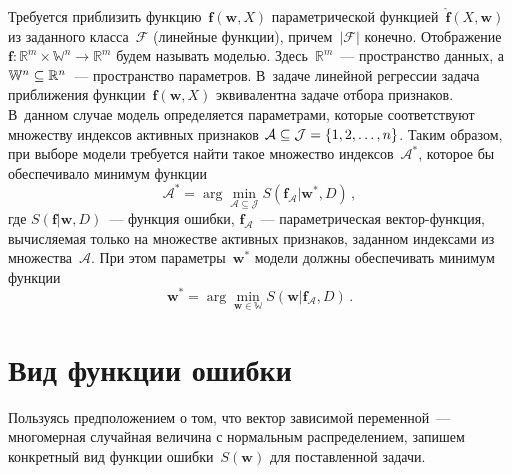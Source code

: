 \begin{multicols}{2}
 Требуется приблизить функцию~$\mathbf{f}(\mathbf{w}, X)$ 
 параметрической функцией~$\widehat{\mathbf{f}}(X,\mathbf{w})$ 
 из заданного класса~$\mathcal{F}$ (линейные функции), 
 причем~$|\mathcal{F}|$ конечно. Отображение
 $\mathbf{f}:\mathbb{R}^m \times \mathbb{W}^n \rightarrow \mathbb{R}^m$ будем называть 
 моделью. Здесь~$\mathbb{R}^m$~--- пространство данных,\linebreak 
 а~$\mathbb{W}^n \hm\subseteq \mathbb{R}^n$~--- пространство параметров. 
 В~задаче линейной регрессии задача приближения функции~$\mathbf{f}(\mathbf{w}, X)$ 
 эквивалентна задаче отбора приз\-наков. В~данном случае модель определяется \mbox{параметрами}, 
 которые соответствуют множеству индексов активных признаков 
 $\mathcal{A}\hm\subseteq \mathcal{J} = \{1,2,\ldots ,n\}$. Таким образом, при 
 выборе модели требуется найти такое множество индексов~$\mathcal{A}^{*}$, 
 которое бы обеспечивало минимум функции
 $$
 \mathcal{A}^{*}=\arg \min\limits_{\mathcal{A} 
 \subseteq \mathcal{J}} S(\mathbf{f}_{\mathcal{A}}|\mathbf{w}^{*},D)\,,
 $$
 где $S(\mathbf{f}|\mathbf{w},D)$~--- функция ошибки, 
 $\mathbf{f}_{\mathcal{A}}$~--- па\-ра\-мет\-ри\-че\-ская век\-тор-функ\-ция, вычисляемая 
 только на множестве активных признаков, заданном индексами из множества~$\mathcal{A}$.
 При этом параметры~$\mathbf{w}^{*}$ модели должны обеспечивать минимум функции
 $$
 \mathbf{w}^{*}=\arg \min \limits_{\mathbf{w}\in\mathbb{W}} 
 S(\mathbf{w}|\mathbf{f}_{\mathcal{A}},D)\,.
 $$

\section{Вид функции ошибки}

Пользуясь предположением о том, что вектор зависимой переменной~--- многомерная 
случайная величина с нормальным распределением, запишем конкретный вид функции 
ошибки~$S(\mathbf{w})$ для по\-став\-лен\-ной задачи.


\end{multicols}
